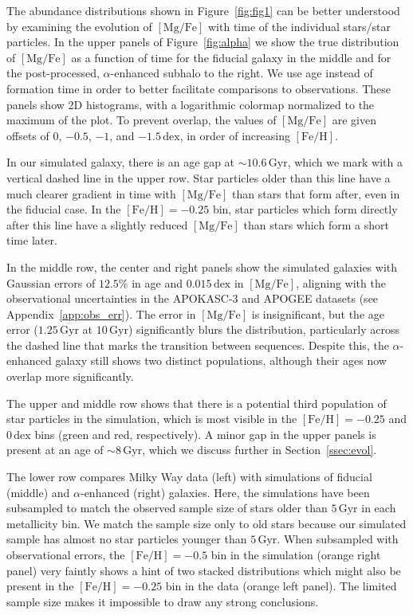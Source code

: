 \documentclass[twocolumn]{aastex631}
\newcommand{\Gyr}{\ensuremath{\textrm{Gyr}}}
\newcommand{\FeH}{\ensuremath{[\textrm{Fe}/\textrm{H}]}}
\newcommand{\MgFe}{\ensuremath{[\textrm{Mg}/\textrm{Fe}]}}
\newcommand{\dex}{\ensuremath{\textrm{dex}}}
\begin{document}
The abundance distributions shown in Figure~\ref{fig:fig1} can be better understood by examining the evolution of \MgFe{} with time of the individual stars/star particles. In the upper panels of Figure~\ref{fig:alpha} we show the true distribution of \MgFe{} as a function of time for the fiducial galaxy in the middle and for the post-processed, $\alpha$-enhanced subhalo to the right. We use age instead of formation time in order to better facilitate comparisons to observations. These panels show 2D histograms, with a logarithmic colormap normalized to the maximum of the plot. To prevent overlap, the values of \MgFe{} are given offsets of $0$, $-0.5$, $-1$, and $-1.5\,\dex$, in order of increasing \FeH{}.

In our simulated galaxy, there is an age gap at $\sim10.6\,\Gyr$, which we mark with a vertical dashed line in the upper row. Star particles older than this line have a much clearer gradient in time with \MgFe{} than stars that form after, even in the fiducial case. In the $\FeH=-0.25$ bin, star particles which form directly after this line have a slightly reduced \MgFe{} than stars which form a short time later.

In the middle row, the center and right panels show the simulated galaxies with Gaussian errors of $12.5\%$ in age and $0.015\,\dex$ in \MgFe{}, aligning with the observational uncertainties in the APOKASC-3 and APOGEE datasets (see Appendix~\ref{app:obs_err}). The error in \MgFe{} is insignificant, but the age error ($1.25\,\Gyr$ at $10\,\Gyr$) significantly blurs the distribution, particularly across the dashed line that marks the transition between sequences. Despite this, the $\alpha$-enhanced galaxy still shows two distinct populations, although their ages now overlap more significantly.

The upper and middle row shows that there is a potential third population of star particles in the simulation, which is most visible in the $\FeH=-0.25$ and $0\,\dex$ bins (green and red, respectively). A minor gap in the upper panels is present at an age of $\sim8\,\Gyr$, which we discuss further in Section~\ref{ssec:evol}.

The lower row compares Milky Way data (left) with simulations of fiducial (middle) and $\alpha$-enhanced (right) galaxies. Here, the simulations have been subsampled to match the observed sample size of stars older than $5\,\Gyr$ in each metallicity bin. We match the sample size only to old stars because our simulated sample has almost no star particles younger than $5\,\Gyr$. When subsampled with observational errors, the $\FeH=-0.5$ bin in the simulation (orange right panel) very faintly shows a hint of two stacked distributions which might also be present in the $\FeH=-0.25$ bin in the data (orange left panel). The limited sample size makes it impossible to draw any strong conclusions.
\end{document}
